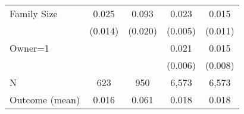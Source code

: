 {\begin{tabular}{l*{4}{c}}
\;Family Size   &    0.025\sym{+}  &    0.093\sym{***}&    0.023\sym{***}&    0.015         \\
                &  (0.014)         &  (0.020)         &  (0.005)         &  (0.011)         \\
\;Owner=1       &                  &                  &    0.021\sym{**} &    0.015\sym{+}  \\
                &                  &                  &  (0.006)         &  (0.008)         \\
\midrule
N               &      623         &      950         &    6,573         &    6,573         \\
Outcome (mean)  &    0.016         &    0.061         &    0.018         &    0.018         \\
\bottomrule
\end{tabular}
}
